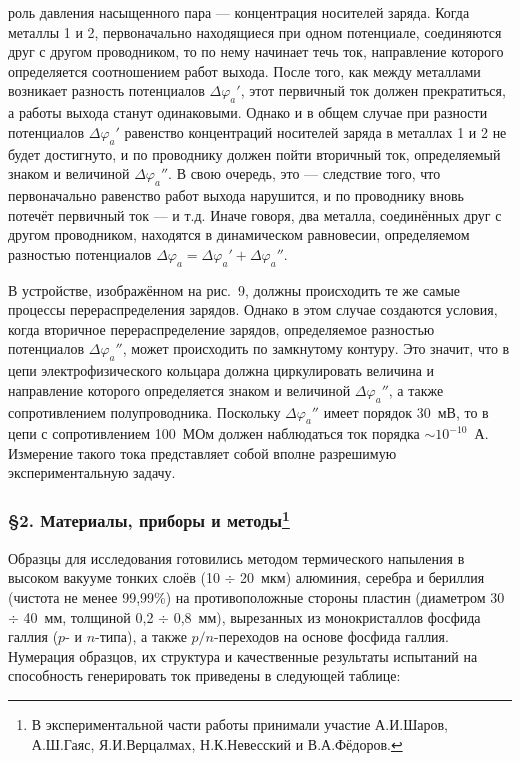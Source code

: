 \documentclass[12pt,a4paper]{article}
\begin{document}
\newpage

роль давления насыщенного пара — концентрация носителей заряда. Когда металлы
1 и 2, первоначально находящиеся при одном потенциале, соединяются друг с
другом проводником, то по нему начинает течь ток, направление которого
определяется соотношением работ выхода. После того, как между металлами
возникает разность потенциалов $\Delta\varphi_a'$, этот первичный ток должен
прекратиться, а работы выхода станут одинаковыми. Однако и в общем случае при
разности потенциалов $\Delta\varphi_a'$ равенство концентраций носителей заряда
в металлах 1 и 2 не будет достигнуто, и по проводнику должен пойти вторичный
ток, определяемый знаком и величиной $\Delta\varphi_a''$. В свою очередь, это
— следствие того, что первоначально равенство работ выхода нарушится, и по
проводнику вновь потечёт первичный ток — и т.д. Иначе говоря, два металла,
соединённых друг с другом проводником, находятся в динамическом равновесии,
определяемом разностью потенциалов $\Delta\varphi_a = \Delta\varphi_a' +
\Delta\varphi_a''$.

В устройстве, изображённом на рис.~9, должны происходить те же самые процессы
перераспределения зарядов. Однако в этом случае создаются условия, когда
вторичное перераспределение зарядов, определяемое разностью потенциалов
$\Delta\varphi_a''$, может происходить по замкнутому контуру. Это значит, что
в цепи электрофизического кольцара должна циркулировать величина и направление
которого определяется знаком и величиной $\Delta\varphi_a''$, а также
сопротивлением полупроводника. Поскольку $\Delta\varphi_a''$ имеет порядок
30~мВ, то в цепи с сопротивлением 100~МОм должен наблюдаться ток порядка
$\sim 10^{-10}$~А. Измерение такого тока представляет собой вполне разрешимую
экспериментальную задачу.

\subsubsection*{§2. Материалы, приборы и методы\footnote{В экспериментальной
части работы принимали участие А.И.Шаров, А.Ш.Гаяс, Я.И.Верцалмах,
Н.К.Невесский и В.А.Фёдоров.}}

Образцы для исследования готовились методом термического напыления в высоком
вакууме тонких слоёв (10 $\div$ 20~мкм) алюминия, серебра и бериллия (чистота
не менее 99,99\%) на противоположные стороны пластин (диаметром 30 $\div$ 40~мм,
толщиной 0,2 $\div$ 0,8~мм), вырезанных из монокристаллов фосфида галлия
($p$- и $n$-типа), а также $p/n$-переходов на основе фосфида галлия. Нумерация
образцов, их структура и качественные результаты испытаний на способность
генерировать ток приведены в следующей таблице:
\end{document}
